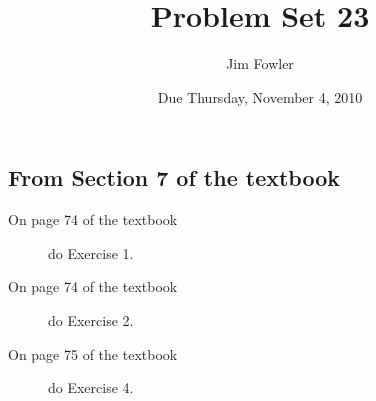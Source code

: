 \documentclass[12pt]{handout}
\author{Jim Fowler}
\title{Problem Set 23}
\date{Due Thursday, November  4, 2010}
\begin{document}
\maketitle










\subsection*{From Section 7 of the textbook}



\begin{description}

\item[On page 74 of the textbook] do Exercise 1.

\item[On page 74 of the textbook] do Exercise 2.

\item[On page 75 of the textbook] do Exercise 4.

\end{description}
\end{document}
